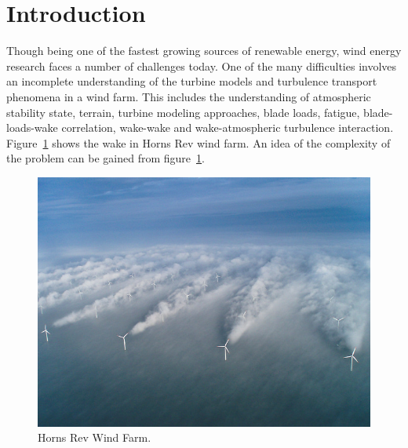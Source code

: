 \documentclass[]{aiaa-tc}%
\begin{document}
\section{Introduction} \label{intro}
Though being one of the fastest growing sources of renewable energy, wind energy research faces a number of challenges today. One of the many difficulties involves an incomplete understanding of the turbine models and turbulence transport phenomena in a wind farm. This includes the understanding of atmospheric stability state, terrain, turbine modeling approaches, blade loads, fatigue, blade-loads-wake correlation, wake-wake and wake-atmospheric turbulence interaction.  Figure~\ref{f:HornsRev} shows the wake in Horns Rev wind farm. An idea of the complexity of the problem can be gained from figure~\ref{f:HornsRev}.

\begin{figure}
 \includegraphics[scale=0.5]{HornsRev.png}
 \caption{Horns Rev Wind Farm.}
 \label{f:HornsRev}
\end{figure}
\end{document}
